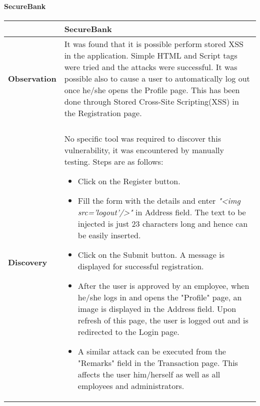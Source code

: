 \paragraph{SecureBank} \mbox{}
\begin{longtable*}{p{.30\textwidth} | p{.70\textwidth}}
    \hline
    & \textbf{SecureBank} \\
    \hline
    \textbf{Observation} &
           It was found that it is possible perform stored XSS in the application. Simple HTML and Script tags were tried and the attacks were successful.
           It was possible also to cause a user to automatically log out once he/she opens the Profile page. This has been done through Stored Cross-Site Scripting(XSS) in the Registration page.
    \\\\
    \textbf{Discovery} &
      No specific tool was required to discover this vulnerability, it was encountered by manually testing. Steps are as follows:
       \begin{itemize}
	       \item Click on the Register button.

	       \item Fill the form with the details and enter \textit{"<img src='logout'/>"} in Address field. The text to be injected is just 23 characters long and hence can be easily inserted.

	       \item Click on the Submit button. A message is displayed for successful registration.

	       \item After the user is approved by an employee, when he/she logs in and opens the "Profile" page, an image is displayed in the Address field. Upon refresh of this page, the user is logged out and is redirected to the Login page.
	       \item A similar attack can be executed from the "Remarks" field in the Transaction page. This affects the user him/herself as well as all employees and administrators.
       \end{itemize}


\end{longtable*}
